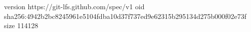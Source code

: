 version https://git-lfs.github.com/spec/v1
oid sha256:4942b2bc8245961e5104fdba10d37f737ed9e62315b295134d275b000f02e73f
size 114128
